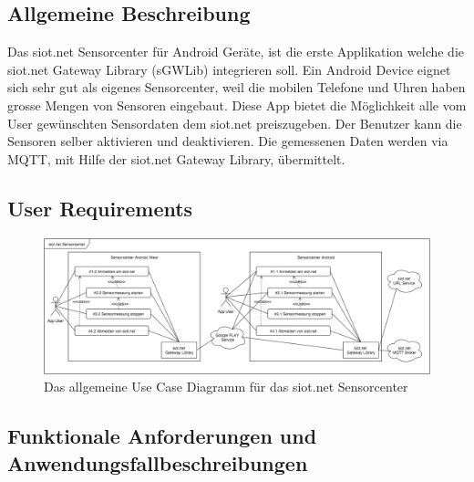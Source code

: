 \subsection{Allgemeine Beschreibung}
Das siot.net Sensorcenter für Android Geräte, ist die erste Applikation welche die siot.net Gateway Library (sGWLib) integrieren soll. Ein Android Device eignet sich sehr gut als eigenes Sensorcenter, weil die mobilen Telefone und Uhren haben grosse Mengen von Sensoren eingebaut. Diese App bietet die Möglichkeit alle vom User gewünschten Sensordaten dem siot.net preiszugeben. Der Benutzer kann die Sensoren selber aktivieren und deaktivieren. Die gemessenen Daten werden via MQTT, mit Hilfe der siot.net Gateway Library, übermittelt.
\subsection{User Requirements}
\begin{figure}[h]
  \centering
  \includegraphics[scale=0.42]{98_Bilder/08_Requirements/UseCaseSensorcenter}
  \caption[Use Case siot.net Sensorcenter]{Das allgemeine Use Case Diagramm für das siot.net Sensorcenter}
\end{figure}
\newpage
\subsection{Funktionale Anforderungen und Anwendungsfallbeschreibungen}
